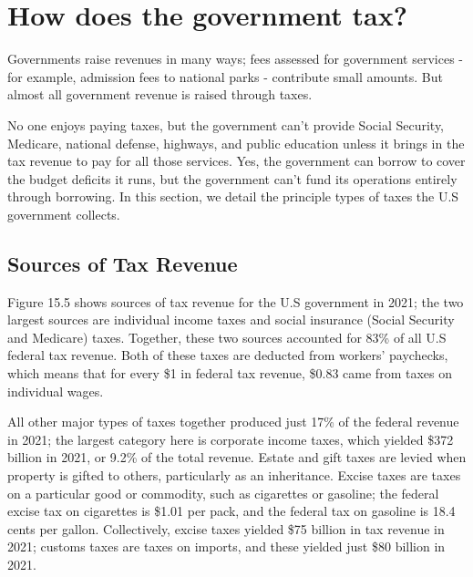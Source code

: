 \documentclass[11pt]{article} %
\begin{document}
\section*{How does the government tax?}
Governments raise revenues in many ways; fees assessed for government services - for example, admission fees to national parks - contribute small amounts. But almost all government revenue is raised through taxes.

No one enjoys paying taxes, but the government can't provide Social Security, Medicare, national defense, highways, and public education unless it brings in the tax revenue to pay for all those services. Yes, the government can borrow to cover the budget deficits it runs, but the government can't fund its operations entirely through borrowing. In this section, we detail the principle types of taxes the U.S government collects.

\subsection*{Sources of Tax Revenue}
Figure 15.5 shows sources of tax revenue for the U.S government in 2021; the two largest sources are individual income taxes and social insurance (Social Security and Medicare) taxes. Together, these two sources accounted for 83\% of all U.S federal tax revenue. Both of these taxes are deducted from workers' paychecks, which means that for every \$1 in federal tax revenue, \$0.83 came from taxes on individual wages.

All other major types of taxes together produced just 17\% of the federal revenue in 2021; the largest category here is corporate income taxes, which yielded \$372 billion in 2021, or 9.2\% of the total revenue. Estate and gift taxes are levied when property is gifted to others, particularly as an inheritance. Excise taxes are taxes on a particular good or commodity, such as cigarettes or gasoline; the federal excise tax on cigarettes is \$1.01 per pack, and the federal tax on gasoline is 18.4 cents per gallon. Collectively, excise taxes yielded \$75 billion in tax revenue in 2021; customs taxes are taxes on imports, and these yielded just \$80 billion in 2021.
\end{document}
